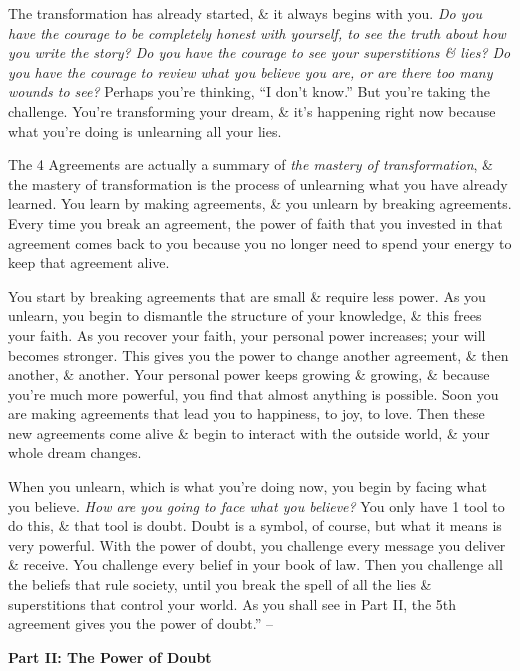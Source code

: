\documentclass{article}
\numberwithin{equation}{section}
\begin{document}
The transformation has already started, \& it always begins with you. \textit{Do you have the courage to be completely honest with yourself, to see the truth about how you write the story? Do you have the courage to see your superstitions \& lies? Do you have the courage to review what you believe you are, or are there too many wounds to see?} Perhaps you're thinking, ``I don't know.'' But you're taking the challenge. You're transforming your dream, \& it's happening right now because what you're doing is unlearning all your lies.

The 4 Agreements are actually a summary of \textit{the mastery of transformation}, \& the mastery of transformation is the process of unlearning what you have already learned. You learn by making agreements, \& you unlearn by breaking agreements. Every time you break an agreement, the power of faith that you invested in that agreement comes back to you because you no longer need to spend your energy to keep that agreement alive.

You start by breaking agreements that are small \& require less power. As you unlearn, you begin to dismantle the structure of your knowledge, \& this frees your faith. As you recover your faith, your personal power increases; your will becomes stronger. This gives you the power to change another agreement, \& then another, \& another. Your personal power keeps growing \& growing, \& because you're much more powerful, you find that almost anything is possible. Soon you are making agreements that lead you to happiness, to joy, to love. Then these new agreements come alive \& begin to interact with the outside world, \& your whole dream changes.

When you unlearn, which is what you're doing now, you begin by facing what you believe. \textit{How are you going to face what you believe?} You only have 1 tool to do this, \& that tool is doubt. Doubt is a symbol, of course, but what it means is very powerful. With the power of doubt, you challenge every message you deliver \& receive. You challenge every belief in your book of law. Then you challenge all the beliefs that rule society, until you break the spell of all the lies \& superstitions that control your world. As you shall see in Part II, the 5th agreement gives you the power of doubt.'' -- \cite[pp. 67--71]{Ruiz_Ruiz2011}


\begin{center}\Large\bf
	Part II: The Power of Doubt
\end{center}
\end{document}
